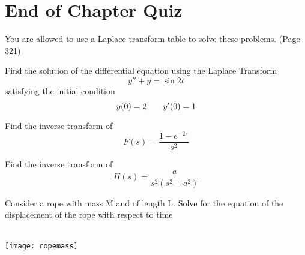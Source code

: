 \section{End of Chapter Quiz}
\begin{multicols*}{2}
	You are allowed to use a Laplace transform table to solve these problems. (Page 321)
	\begin{q}
		Find the solution of the differential equation using the Laplace Transform\[ y'' + y = \sin 2t \] satisfying the initial condition \[ y(0) = 2, \indent y'(0) = 1 \]
	\end{q}
	\begin{q}
		Find the inverse transform of 
		\[ F(s) = \dfrac{1-e^{-2s}}{s^2} \]
	\end{q}
	\begin{q}
		Find the inverse transform of \[ H(s) = \dfrac{a}{s^2(s^2+a^2)} \]
	\end{q}
	\begin{q}
		Consider a rope with mass M and of length L. Solve for the equation of the displacement of the rope with respect to time \\ \\
		\begin{center}
			\texttt{[image: ropemass]}
		\end{center}
		
	\end{q}
	

\end{multicols*}

